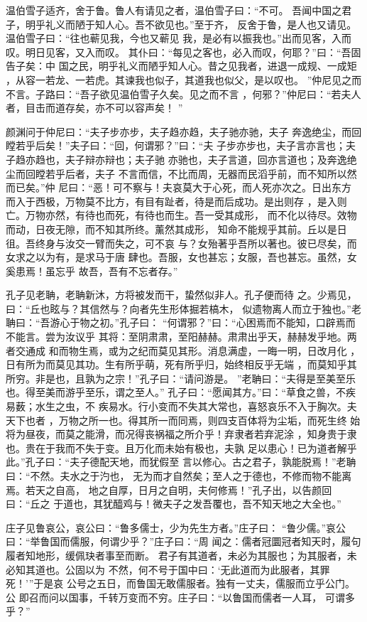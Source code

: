 \documentclass[a4paper,12pt,UTF8,twoside]{ctexbook}
\begin{document}
温伯雪子适齐，舍于鲁。鲁人有请见之者，温伯雪子曰：“不可。 吾闻中国之君子，明乎礼义而陋于知人心。吾不欲见也。”至于齐， 反舍于鲁，是人也又请见。温伯雪子曰：“往也蕲见我，今也又蕲见 我，是必有以振我也。”出而见客，入而叹。明日见客，又入而叹。 其仆曰：“每见之客也，必入而叹，何耶？”曰：“吾固告子矣：中 国之民，明乎礼义而陋乎知人心。昔之见我者，进退一成规、一成矩 ，从容一若龙、一若虎。其谏我也似子，其道我也似父，是以叹也。 ”仲尼见之而不言。子路曰：“吾子欲见温伯雪子久矣。见之而不言 ，何邪？”仲尼曰：“若夫人者，目击而道存矣，亦不可以容声矣！ ”

颜渊问于仲尼曰：“夫子步亦步，夫子趋亦趋，夫子驰亦驰，夫子 奔逸绝尘，而回瞠若乎后矣！”夫子曰：“回，何谓邪？”曰：“夫 子步亦步也，夫子言亦言也；夫子趋亦趋也，夫子辩亦辩也；夫子驰 亦驰也，夫子言道，回亦言道也；及奔逸绝尘而回瞠若乎后者，夫子 不言而信，不比而周，无器而民滔乎前，而不知所以然而已矣。”仲 尼曰：“恶！可不察与！夫哀莫大于心死，而人死亦次之。日出东方 而入于西极，万物莫不比方，有目有趾者，待是而后成功。是出则存 ，是入则亡。万物亦然，有待也而死，有待也而生。吾一受其成形， 而不化以待尽。效物而动，日夜无隙，而不知其所终。薰然其成形， 知命不能规乎其前。丘以是日徂。吾终身与汝交一臂而失之，可不哀 与？女殆著乎吾所以著也。彼已尽矣，而女求之以为有，是求马于唐 肆也。吾服，女也甚忘；女服，吾也甚忘。虽然，女奚患焉！虽忘乎 故吾，吾有不忘者存。”

孔子见老聃，老聃新沐，方将被发而干，蛰然似非人。孔子便而待 之。少焉见，曰：“丘也眩与？其信然与？向者先生形体掘若槁木， 似遗物离人而立于独也。”老聃曰：“吾游心于物之初。”孔子曰： “何谓邪？”曰：“心困焉而不能知，口辟焉而不能言。尝为汝议乎 其将：至阴肃肃，至阳赫赫。肃肃出乎天，赫赫发乎地。两者交通成 和而物生焉，或为之纪而莫见其形。消息满虚，一晦一明，日改月化 ，日有所为而莫见其功。生有所乎萌，死有所乎归，始终相反乎无端 ，而莫知乎其所穷。非是也，且孰为之宗！”孔子曰：“请问游是。 ”老聃曰：“夫得是至美至乐也。得至美而游乎至乐，谓之至人。” 孔子曰：“愿闻其方。”曰：“草食之兽，不疾易薮；水生之虫，不 疾易水。行小变而不失其大常也，喜怒哀乐不入于胸次。夫天下也者 ，万物之所一也。得其所一而同焉，则四支百体将为尘垢，而死生终 始将为昼夜，而莫之能滑，而况得丧祸福之所介乎！弃隶者若弃泥涂 ，知身贵于隶也。贵在于我而不失于变。且万化而未始有极也，夫孰 足以患心！已为道者解乎此。”孔子曰：“夫子德配天地，而犹假至 言以修心。古之君子，孰能脱焉！”老聃曰：“不然。夫水之于汋也， 无为而才自然矣；至人之于德也，不修而物不能离焉。若天之自高， 地之自厚，日月之自明，夫何修焉！”孔子出，以告颜回曰：“丘之 于道也，其犹醯鸡与！微夫子之发吾覆也，吾不知天地之大全也。”

庄子见鲁哀公，哀公曰：“鲁多儒士，少为先生方者。”庄子曰： “鲁少儒。”哀公曰：“举鲁国而儒服，何谓少乎？”庄子曰：“周 闻之：儒者冠圜冠者知天时，履句履者知地形，缓佩玦者事至而断。 君子有其道者，未必为其服也；为其服者，未必知其道也。公固以为 不然，何不号于国中曰：‘无此道而为此服者，其罪死！’”于是哀 公号之五日，而鲁国无敢儒服者。独有一丈夫，儒服而立乎公门。公 即召而问以国事，千转万变而不穷。庄子曰：“以鲁国而儒者一人耳， 可谓多乎？”
\end{document}
